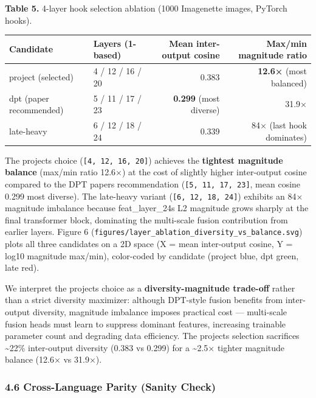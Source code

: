 \documentclass[
]{article}
\newcounter{none} %
\begin{document}
\textbf{Table 5.} 4-layer hook selection ablation (1000 Imagenette
images, PyTorch hooks).

{\def\LTcaptype{none} %
\begin{longtable}[]{@{}llrr@{}}
\toprule\noalign{}
Candidate & Layers (1-based) & Mean inter-output cosine & Max/min
magnitude ratio \\
\midrule\noalign{}
\endhead
\bottomrule\noalign{}
\endlastfoot
project (selected) & 4 / 12 / 16 / 20 & 0.383 & \textbf{12.6×} (most
balanced) \\
dpt (paper recommended) & 5 / 11 / 17 / 23 & \textbf{0.299} (most
diverse) & 31.9× \\
late-heavy & 6 / 12 / 18 / 24 & 0.339 & 84× (last hook dominates) \\
\end{longtable}
}

The project\textquotesingle s choice (\texttt{{[}4,\ 12,\ 16,\ 20{]}})
achieves the \textbf{tightest magnitude balance} (max/min ratio 12.6×)
at the cost of slightly higher inter-output cosine compared to the DPT
paper\textquotesingle s recommendation (\texttt{{[}5,\ 11,\ 17,\ 23{]}},
mean cosine 0.299 most diverse). The late-heavy variant
(\texttt{{[}6,\ 12,\ 18,\ 24{]}}) exhibits an 84× magnitude imbalance
because feat\_layer\_24\textquotesingle s L2 magnitude grows sharply at
the final transformer block, dominating the multi-scale fusion
contribution from earlier layers. Figure 6
(\texttt{figures/layer\_ablation\_diversity\_vs\_balance.svg}) plots all
three candidates on a 2D space (X = mean inter-output cosine, Y = log10
magnitude max/min), color-coded by candidate (project blue, dpt green,
late red).

We interpret the project\textquotesingle s choice as a
\textbf{diversity-magnitude trade-off} rather than a strict diversity
maximizer: although DPT-style fusion benefits from inter-output
diversity, magnitude imbalance imposes practical cost --- multi-scale
fusion heads must learn to suppress dominant features, increasing
trainable parameter count and degrading data efficiency. The
project\textquotesingle s selection sacrifices \textasciitilde22\%
inter-output diversity (0.383 vs 0.299) for a \textasciitilde2.5×
tighter magnitude balance (12.6× vs 31.9×).

\subsubsection{4.6 Cross-Language Parity (Sanity
Check)}\label{46-cross-language-parity-sanity-check}
\end{document}
